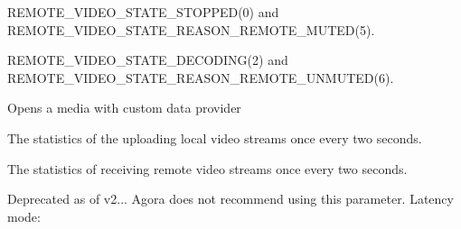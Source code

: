\begin{DoxyRefList}
\begin{DoxyItemize}
\item {\ttfamily R\+E\+M\+O\+T\+E\+\_\+\+V\+I\+D\+E\+O\+\_\+\+S\+T\+A\+T\+E\+\_\+\+S\+T\+O\+P\+P\+E\+D(0)} and {\ttfamily R\+E\+M\+O\+T\+E\+\_\+\+V\+I\+D\+E\+O\+\_\+\+S\+T\+A\+T\+E\+\_\+\+R\+E\+A\+S\+O\+N\+\_\+\+R\+E\+M\+O\+T\+E\+\_\+\+M\+U\+T\+E\+D(5)}.
\item {\ttfamily R\+E\+M\+O\+T\+E\+\_\+\+V\+I\+D\+E\+O\+\_\+\+S\+T\+A\+T\+E\+\_\+\+D\+E\+C\+O\+D\+I\+N\+G(2)} and {\ttfamily R\+E\+M\+O\+T\+E\+\_\+\+V\+I\+D\+E\+O\+\_\+\+S\+T\+A\+T\+E\+\_\+\+R\+E\+A\+S\+O\+N\+\_\+\+R\+E\+M\+O\+T\+E\+\_\+\+U\+N\+M\+U\+T\+E\+D(6)}. 
\end{DoxyItemize}
\item[Member \mbox{\hyperlink{interfaceio_1_1agora_1_1mediaplayer_1_1_i_media_player_ab3025e58294e60375dd52782bcd1207f}{io.agora.mediaplayer.I\+Media\+Player.open\+With\+Custom\+Source}} (long start\+Pos, \mbox{\hyperlink{interfaceio_1_1agora_1_1mediaplayer_1_1_i_media_player_custom_data_provider}{I\+Media\+Player\+Custom\+Data\+Provider}} provider)]\label{deprecated__deprecated000001}%
%
 Opens a media with custom data provider  
\item[Member \mbox{\hyperlink{classio_1_1agora_1_1rtc2_1_1_i_rtc_engine_event_handler_a9af3b09098b1034319184103157b90db}{io.agora.rtc2.I\+Rtc\+Engine\+Event\+Handler.on\+Local\+Video\+Stat}} (int sent\+Bitrate, int sent\+Frame\+Rate)]\label{deprecated__deprecated000011}%
%
 The statistics of the uploading local video streams once every two seconds.  
\item[Member \mbox{\hyperlink{classio_1_1agora_1_1rtc2_1_1_i_rtc_engine_event_handler_a8a84e26cf72185b3c944b3a10983f600}{io.agora.rtc2.I\+Rtc\+Engine\+Event\+Handler.on\+Remote\+Video\+Stat}} (int uid, int delay, int received\+Bitrate, int received\+Frame\+Rate)]\label{deprecated__deprecated000012}%
%
 The statistics of receiving remote video streams once every two seconds. 
\item[Member \mbox{\hyperlink{classio_1_1agora_1_1rtc2_1_1live_1_1_live_transcoding_a20aec79d70091c9d487d4c21988e59c6}{io.agora.rtc2.live.Live\+Transcoding.low\+Latency}} ]\label{deprecated__deprecated000013}%
%
Deprecated as of v2... Agora does not recommend using this parameter. Latency mode\+:  
\item[Member \mbox{\hyperlink{classio_1_1agora_1_1rtc2_1_1live_1_1_live_transcoding_a602fd601a752e54b776c6743b28a1614}{io.agora.rtc2.live.Live\+Transcoding.user\+Count}} ]\label{deprecated__deprecated000014}%

\end{DoxyRefList}
